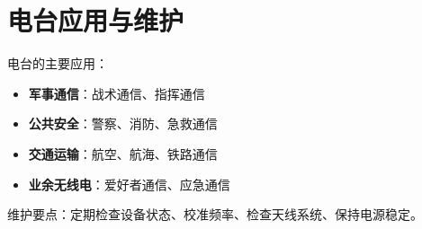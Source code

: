 \section{电台应用与维护}
\label{sec:radio_station_maintenance}

电台的主要应用：

\begin{itemize}
    \item \textbf{军事通信}：战术通信、指挥通信
    \item \textbf{公共安全}：警察、消防、急救通信
    \item \textbf{交通运输}：航空、航海、铁路通信
    \item \textbf{业余无线电}：爱好者通信、应急通信
\end{itemize}

维护要点：定期检查设备状态、校准频率、检查天线系统、保持电源稳定。